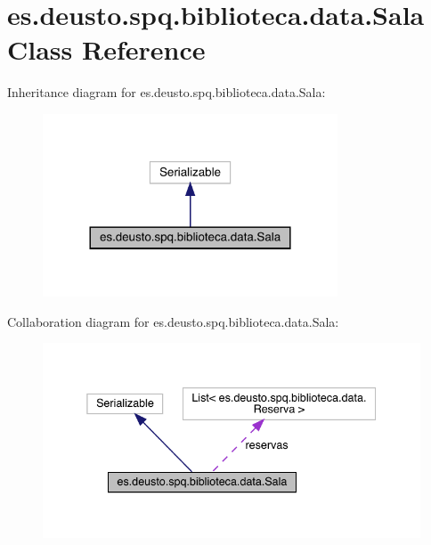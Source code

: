 \hypertarget{classes_1_1deusto_1_1spq_1_1biblioteca_1_1data_1_1_sala}{}\section{es.\+deusto.\+spq.\+biblioteca.\+data.\+Sala Class Reference}
\label{classes_1_1deusto_1_1spq_1_1biblioteca_1_1data_1_1_sala}


Inheritance diagram for es.\+deusto.\+spq.\+biblioteca.\+data.\+Sala\+:
\nopagebreak
\begin{figure}[H]
\begin{center}
\leavevmode
\includegraphics[width=248pt]{classes_1_1deusto_1_1spq_1_1biblioteca_1_1data_1_1_sala__inherit__graph}
\end{center}
\end{figure}


Collaboration diagram for es.\+deusto.\+spq.\+biblioteca.\+data.\+Sala\+:
\nopagebreak
\begin{figure}[H]
\begin{center}
\leavevmode
\includegraphics[width=338pt]{classes_1_1deusto_1_1spq_1_1biblioteca_1_1data_1_1_sala__coll__graph}
\end{center}
\end{figure}
